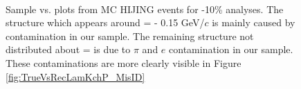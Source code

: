 \documentclass[../AnalysisNoteJBuxton.tex]{subfiles}
\begin{document}
\begin{figure}[h!]
  \centering
  \\
  \caption[Momentum Resolution: Sample \ktrue vs. \krec]{Sample \ktrue vs. \krec plots from MC HIJING events for -10\% analyses.  The structure which appears around \krec = \ktrue - 0.15 GeV/$c$ is mainly caused by \Ks contamination in our \LamALam sample.  The remaining structure not distributed about \krec = \ktrue is due to $\pi$ and $e$ contamination in our \Kpm sample.  These contaminations are more clearly visible in Figure \ref{fig:TrueVsRecLamKchP_MisID}}
  \label{fig:TrueVsRecLamKchP}
\end{figure}
\end{document}
